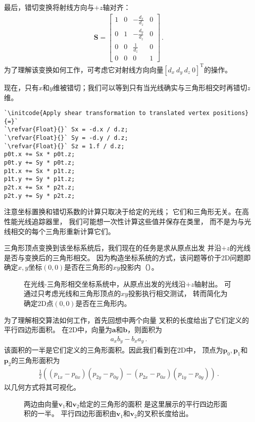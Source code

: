 最后，错切变换将射线方向与$+z$轴对齐：
\begin{align*}
    \bm S=\left[\begin{array}{rrrr}
            1 & 0 & \displaystyle-\frac{d_x}{d_z} & 0 \\
            0 & 1 & \displaystyle-\frac{d_y}{d_z} & 0 \\
            0 & 0 & \displaystyle\frac{1}{d_z}    & 0 \\
            0 & 0 & 0                             & 1
        \end{array}\right]\, .
\end{align*}
为了理解该变换如何工作，可考虑它对射线方向向量$[d_x\ d_y\ d_z\ 0]^{\mathrm{T}}$的操作。

现在，只有$x$和$y$维被错切；我们可以等到只有当光线确实与三角形相交时再错切$z$维。
\begin{lstlisting}
`\initcode{Apply shear transformation to translated vertex positions}{=}`
`\refvar{Float}{}` Sx = -d.x / d.z;
`\refvar{Float}{}` Sy = -d.y / d.z;
`\refvar{Float}{}` Sz = 1.f / d.z;
p0t.x += Sx * p0t.z;
p0t.y += Sy * p0t.z;
p1t.x += Sx * p1t.z;
p1t.y += Sy * p1t.z;
p2t.x += Sx * p2t.z;
p2t.y += Sy * p2t.z;
\end{lstlisting}

注意坐标置换和错切系数的计算只取决于给定的光线；
它们和三角形无关。在高性能光线追踪器里，
我们可能想一次性计算这些值并保存在类里，
而不是为与光线相交的每个三角形重新计算它们。

三角形顶点变换到该坐标系统后，我们现在的任务是求从原点出发
并沿$+z$的光线是否与变换后的三角形相交。
因为构造坐标系统的方式，该问题等价于2D问题即
确定$x,y$坐标$(0,0)$是否在三角形的$xy$投影内（）。
\begin{figure}[htbp]
    \centering
    \caption{在光线-三角形相交坐标系统中，从原点出发的光线沿$+z$轴射出。
        可通过只考虑光线和三角形顶点的$xy$投影执行相交测试，
        转而简化为确定2D点$(0,0)$是否在三角形内。}
    \label{fig:3.12}
\end{figure}

为了理解相交算法如何工作，首先回想中两个向量
叉积的长度给出了它们定义的平行四边形面积。
在2D中，向量为$\bm a$和$\bm b$，则面积为
\begin{align*}
    a_xb_y-b_xa_y\, .
\end{align*}
该面积的一半是它们定义的三角形面积。因此我们看到在2D中，
顶点为$\bm p_0,\bm p_1$和$\bm p_2$的三角形面积为
\begin{align*}
    \frac{1}{2}((p_{1x}-p_{0x})(p_{2y}-p_{0y})-(p_{2x}-p_{0x})(p_{1y}-p_{0y}))\, .
\end{align*}
以几何方式将其可视化。
\begin{figure}[htbp]
    \centering
    \caption{两边由向量$\bm v_1$和$\bm v_2$给定的三角形的面积
        是这里展示的平行四边形面积的一半。
        平行四边形面积由$\bm v_1$和$\bm v_2$的叉积长度给出。}
    \label{fig:3.13}
\end{figure}


